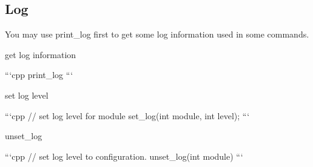 \subsection*{Log}

You may use {\ttfamily print\+\_\+log} first to get some log information used in some commands.


\begin{DoxyEnumerate}
\item get log information

```cpp print\+\_\+log ```
\item set log level

```cpp // set log level for module set\+\_\+log(int module, int level); ```
\item unset\+\_\+log

```cpp // set log level to configuration. unset\+\_\+log(int module) ``` 
\end{DoxyEnumerate}